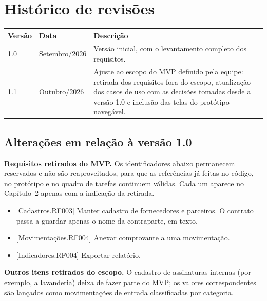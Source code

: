\documentclass[11pt,a4paper,oneside]{report}
\begin{document}

\chapter*{Histórico de revisões}

\begin{tabularx}{\linewidth}{@{}l l X@{}}
  \toprule
  \textbf{Versão} & \textbf{Data} & \textbf{Descrição} \\
  \midrule
  1.0 & Setembro/2026 & Versão inicial, com o levantamento completo dos requisitos. \\
  1.1 & Outubro/2026  & Ajuste ao escopo do MVP definido pela equipe: retirada dos requisitos
                        fora do escopo, atualização dos casos de uso com as decisões tomadas desde
                        a versão 1.0 e inclusão das telas do protótipo navegável. \\
  \bottomrule
\end{tabularx}

\section*{Alterações em relação à versão 1.0}

\textbf{Requisitos retirados do MVP.} Os identificadores abaixo permanecem reservados e não são
reaproveitados, para que as referências já feitas no código, no protótipo e no quadro de tarefas
continuem válidas. Cada um aparece no Capítulo~2 apenas com a indicação da retirada.
\begin{itemize}
  \item {[Cadastros.RF003]} Manter cadastro de fornecedores e parceiros. O contrato passa a guardar
        apenas o nome da contraparte, em texto.
  \item {[Movimentações.RF004]} Anexar comprovante a uma movimentação.
  \item {[Indicadores.RF004]} Exportar relatório.
\end{itemize}

\textbf{Outros itens retirados do escopo.} O cadastro de assinaturas internas (por exemplo, a
lavanderia) deixa de fazer parte do MVP; os valores correspondentes são lançados como
movimentações de entrada classificadas por categoria.
\end{document}
